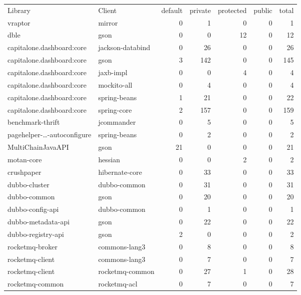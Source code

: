 \begin{table}[ht]
\centering
\begingroup\small
\begin{tabular}{ll!{\color{verylightgray}\vrule}rrrr!{\color{verylightgray}\vrule}r}
Library & Client & default & private & protected & public & total \\ 
  \hline
vraptor & mirror & 0 & 1 & 0 & 0 & 1 \\ 
  dble & gson & 0 & 0 & 12 & 0 & 12 \\ 
  capitalone.dashboard:core & jackson-databind & 0 & 26 & 0 & 0 & 26 \\ 
  capitalone.dashboard:core & gson & 3 & 142 & 0 & 0 & 145 \\ 
  capitalone.dashboard:core & jaxb-impl & 0 & 0 & 4 & 0 & 4 \\ 
  capitalone.dashboard:core & mockito-all & 0 & 4 & 0 & 0 & 4 \\ 
  capitalone.dashboard:core & spring-beans & 1 & 21 & 0 & 0 & 22 \\ 
  capitalone.dashboard:core & spring-core & 2 & 157 & 0 & 0 & 159 \\ 
  benchmark-thrift & jcommander & 0 & 5 & 0 & 0 & 5 \\ 
  pagehelper-\ldots-autoconfigure & spring-beans & 0 & 2 & 0 & 0 & 2 \\ 
  MultiChainJavaAPI & gson & 21 & 0 & 0 & 0 & 21 \\ 
  motan-core & hessian & 0 & 0 & 2 & 0 & 2 \\ 
  crushpaper & hibernate-core & 0 & 33 & 0 & 0 & 33 \\ 
  dubbo-cluster & dubbo-common & 0 & 31 & 0 & 0 & 31 \\ 
  dubbo-common & gson & 0 & 20 & 0 & 0 & 20 \\ 
  dubbo-config-api & dubbo-common & 0 & 1 & 0 & 0 & 1 \\ 
  dubbo-metadata-api & gson & 0 & 22 & 0 & 0 & 22 \\ 
  dubbo-registry-api & gson & 2 & 0 & 0 & 0 & 2 \\ 
  rocketmq-broker & commons-lang3 & 0 & 8 & 0 & 0 & 8 \\ 
  rocketmq-client & commons-lang3 & 0 & 7 & 0 & 0 & 7 \\ 
  rocketmq-client & rocketmq-common & 0 & 27 & 1 & 0 & 28 \\ 
  rocketmq-common & rocketmq-acl & 0 & 7 & 0 & 0 & 7 \\ 

\end{tabular}
\end{table}
